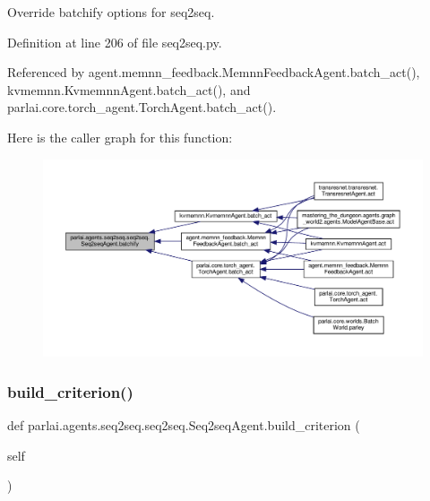 \begin{DoxyVerb}Override batchify options for seq2seq.\end{DoxyVerb}
 

Definition at line 206 of file seq2seq.\+py.



Referenced by agent.\+memnn\+\_\+feedback.\+Memnn\+Feedback\+Agent.\+batch\+\_\+act(), kvmemnn.\+Kvmemnn\+Agent.\+batch\+\_\+act(), and parlai.\+core.\+torch\+\_\+agent.\+Torch\+Agent.\+batch\+\_\+act().

Here is the caller graph for this function\+:
\nopagebreak
\begin{figure}[H]
\begin{center}
\leavevmode
\includegraphics[width=350pt]{classparlai_1_1agents_1_1seq2seq_1_1seq2seq_1_1Seq2seqAgent_ab7917b41c18eea62f9e7b63c36466bb6_icgraph}
\end{center}
\end{figure}
\mbox{\label{classparlai_1_1agents_1_1seq2seq_1_1seq2seq_1_1Seq2seqAgent_aad570608fb05da482411201aa2e0b47f}} 
\subsubsection{\texorpdfstring{build\+\_\+criterion()}{build\_criterion()}}
{\footnotesize\ttfamily def parlai.\+agents.\+seq2seq.\+seq2seq.\+Seq2seq\+Agent.\+build\+\_\+criterion (\begin{DoxyParamCaption}\item[{}]{self }\end{DoxyParamCaption})}



